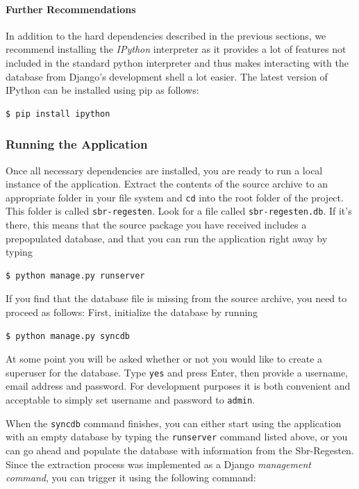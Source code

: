\paragraph{Further Recommendations}
In addition to the hard dependencies described in the previous
sections, we recommend installing the \emph{IPython} interpreter as it
provides a lot of features not included in the standard python
interpreter and thus makes interacting with the database from Django's
development shell a lot easier. The latest version of IPython can be
installed using pip as follows:

\begin{verbatim}
$ pip install ipython
\end{verbatim}

\subsubsection{Running the Application}
\label{sec:run}

Once all necessary dependencies are installed, you are ready to run a
local instance of the application. Extract the contents of the source
archive to an appropriate folder in your file system and \texttt{cd}
into the root folder of the project. This folder is called
\texttt{sbr-regesten}. Look for a file called
\texttt{sbr-regesten.db}. If it's there, this means that the source
package you have received includes a prepopulated database, and that
you can run the application right away by typing

\begin{verbatim}
$ python manage.py runserver
\end{verbatim}

If you find that the database file is missing from the source archive,
you need to proceed as follows: First, initialize the database by running

\begin{verbatim}
$ python manage.py syncdb
\end{verbatim}

At some point you will be asked whether or not you would like to
create a superuser for the database. Type \texttt{yes} and press
Enter, then provide a username, email address and password. For
development purposes it is both convenient and acceptable to simply
set username and password to \texttt{admin}.

When the \texttt{syncdb} command finishes, you can either start using
the application with an empty database by typing the
\texttt{runserver} command listed above, or you can go ahead and
populate the database with information from the Sbr-Regesten. Since
the extraction process was implemented as a Django \emph{management command},
you can trigger it using the following command:

